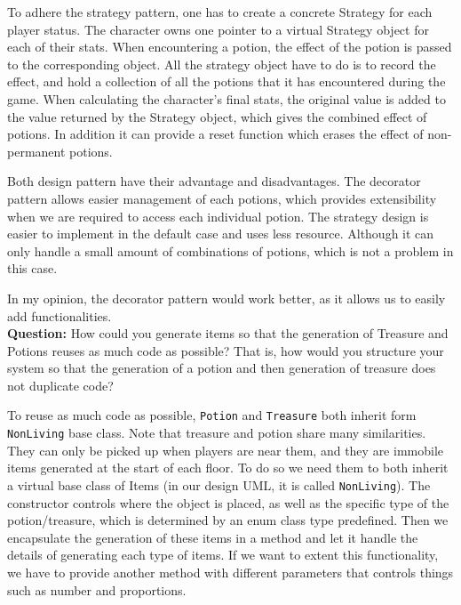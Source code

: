 \documentclass[11pt]{article}
\theoremstyle{plain} \newtheorem{theorem*}{Theorem}[subsection]
\begin{document}
To adhere the strategy pattern, one has to create a concrete Strategy for each
player status. The character owns one pointer to a virtual Strategy object for
each of their stats. When encountering a potion, the effect of the potion is
passed to the corresponding object. All the strategy object have to do is to
record the effect, and hold a collection of all the potions that it has
encountered during the game. When calculating the character’s final stats, the
original value is added to the value returned by the Strategy object, which
gives the combined effect of potions. In addition it can provide a reset
function which erases the effect of non-permanent potions.  

Both design pattern have their advantage and disadvantages. The decorator
pattern allows easier management of each potions, which provides extensibility
when we are required to access each individual potion. The strategy design is
easier to implement in the default case and uses less resource. Although it can
only handle a small amount of combinations of potions, which is not a problem
in this case.  

In my opinion, the decorator pattern would work better, as it allows us to
easily add functionalities. \\

\textbf{Question:}
How could you generate items so that the generation of Treasure and Potions
reuses as much code as possible? That is, how would you structure your system
so that the generation of a potion and then generation of treasure does not
duplicate code? 

To reuse as much code as possible, \texttt{Potion} and \texttt{Treasure}
both inherit form \texttt{NonLiving} base class.
Note that treasure and potion share many similarities. They
can only be picked up when players are near them, and they are immobile items
generated at the start of each floor. To do so we need them to both inherit a
virtual base class of Items (in our design UML, it is called \texttt{NonLiving}). The
constructor controls where the object is placed, as well as the specific type
of the potion/treasure, which is determined by an enum class type predefined.
Then we encapsulate the generation of these items in a method and let it handle
the details of generating each type of items. If we want to extent this
functionality, we have to provide another method with different parameters that
controls things such as number and proportions. 
\end{document}
